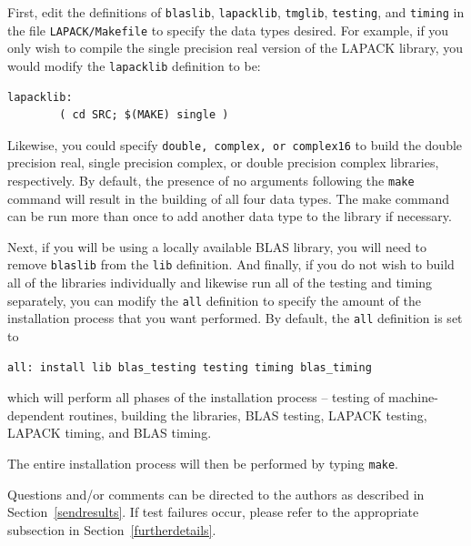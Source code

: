 \documentclass[11pt]{report}
\begin{document}
First, edit the definitions of \texttt{blaslib}, \texttt{lapacklib},
\texttt{tmglib}, \texttt{testing}, and \texttt{timing} in the file \texttt{LAPACK/Makefile}
to specify the data types desired.  For example,
if you only wish to compile the single precision real version of the
LAPACK library, you would modify the \texttt{lapacklib} definition to be:

\begin{verbatim}
lapacklib:
        ( cd SRC; $(MAKE) single )
\end{verbatim}

Likewise, you could specify \texttt{double, complex, or complex16} to
build the double precision real, single precision complex, or double
precision complex libraries, respectively.  By default, the presence of
no arguments following the \texttt{make} command will result in the
building of all four data types.
The make command can be run more than once to add another
data type to the library if necessary.

      
Next, if you will be using a locally available BLAS library, you will need
to remove \texttt{blaslib} from the \texttt{lib} definition.  And finally,
if you do not wish to build all of the libraries individually and
likewise run all of the testing and timing separately, you can
modify the \texttt{all} definition to specify the amount of the
installation process that you want performed.  By default,
the \texttt{all} definition is set to
\begin{verbatim}
all: install lib blas_testing testing timing blas_timing
\end{verbatim}
which will perform all phases of the installation
process -- testing of machine-dependent routines, building the libraries,
BLAS testing, LAPACK testing, LAPACK timing, and BLAS timing.

The entire installation process will then be performed by typing
\texttt{make}.

Questions and/or comments can be directed to the
authors as described in Section~\ref{sendresults}.  If test failures
occur, please refer to the appropriate subsection in
Section~\ref{furtherdetails}.
\end{document}
